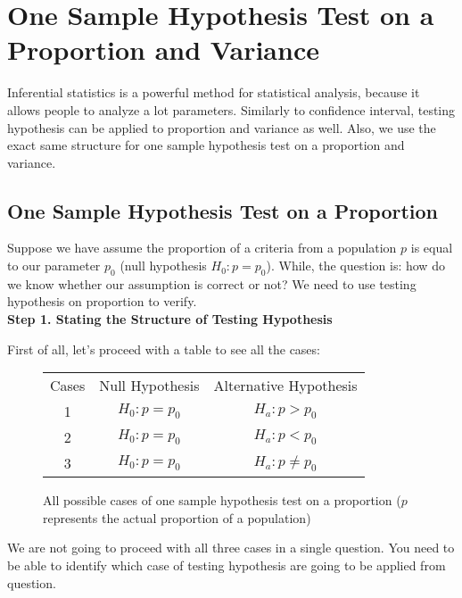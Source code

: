 \setcounter{chapter}{11}
\chapter{One Sample Hypothesis Test on a Proportion and Variance}

Inferential statistics is a powerful method for statistical analysis, because it allows people to analyze a lot parameters. Similarly to confidence interval, testing hypothesis can be applied to proportion and variance as well. Also, we use the exact same structure for one sample hypothesis test on a proportion and variance.

\section{One Sample Hypothesis Test on a Proportion}

Suppose we have assume the proportion of a criteria from a population $p$ is equal to our parameter $p_0$ (null hypothesis $H_0: p = p_0$). While, the question is: how do we know whether our assumption is correct or not? We need to use testing hypothesis on proportion to verify. \\

\textbf{Step 1. Stating the Structure of Testing Hypothesis}

First of all, let's proceed with a table to see all the cases:

\begin{center}
\begin{figure}[H]
\centering
\begin{tabular}{ c c c }
Cases & Null Hypothesis & Alternative Hypothesis \\
     1	   & $H_0: p = p_0$ & $H_a: p > p_0$ \\
     2	   & $H_0: p = p_0$ & $H_a: p < p_0$ \\
     3    & $H_0: p = p_0$ & $H_a: p \neq p_0$ \\
\end{tabular}
\caption{All possible cases of one sample hypothesis test on a proportion ($p$ represents the actual proportion of a population)}
\end{figure}
\end{center}
\vspace{-0.75cm}
We are not going to proceed with all three cases in a single question. You need to be able to identify which case of testing hypothesis are going to be applied from question.\\

